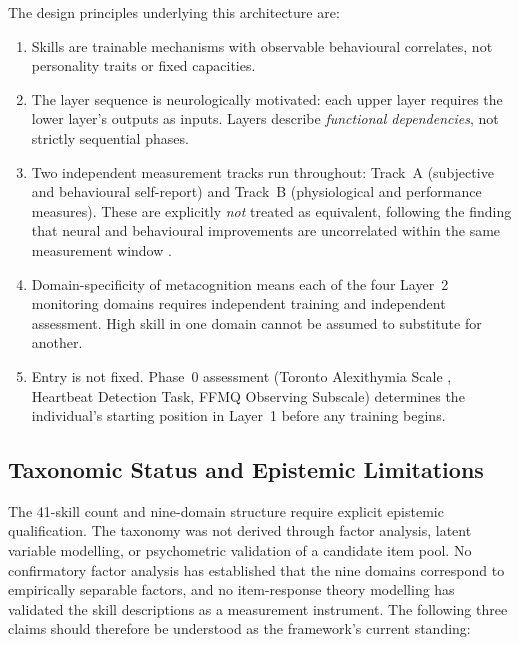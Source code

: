 \documentclass[12pt, a4paper]{article}
\begin{document}
\noindent
The design principles underlying this architecture are:

\begin{enumerate}[leftmargin=2em]
\item Skills are trainable mechanisms with observable behavioural correlates, not
personality traits or fixed capacities.
\item The layer sequence is neurologically motivated: each upper layer requires the
lower layer's outputs as inputs. Layers describe \emph{functional dependencies},
not strictly sequential phases.
\item Two independent measurement tracks run throughout: Track~A (subjective and
behavioural self-report) and Track~B (physiological and performance measures).
These are explicitly \emph{not} treated as equivalent, following the finding that
neural and behavioural improvements are uncorrelated within the same measurement
window \citep{yue2023}.
\item Domain-specificity of metacognition \citep{morales2018, fleming2014} means
each of the four Layer~2 monitoring domains requires independent training and
independent assessment. High skill in one domain cannot be assumed to substitute
for another.
\item Entry is not fixed. Phase~0 assessment (Toronto Alexithymia Scale \citep{schandry1981},
Heartbeat Detection Task, FFMQ Observing Subscale) determines the individual's
starting position in Layer~1 before any training begins.
\end{enumerate}

\subsection{Taxonomic Status and Epistemic Limitations}

The 41-skill count and nine-domain structure require explicit epistemic qualification.
The taxonomy was not derived through factor analysis, latent variable modelling, or
psychometric validation of a candidate item pool. No confirmatory factor analysis
has established that the nine domains correspond to empirically separable factors,
and no item-response theory modelling has validated the skill descriptions as a
measurement instrument. The following three claims should therefore be understood
as the framework's current standing:
\end{document}
